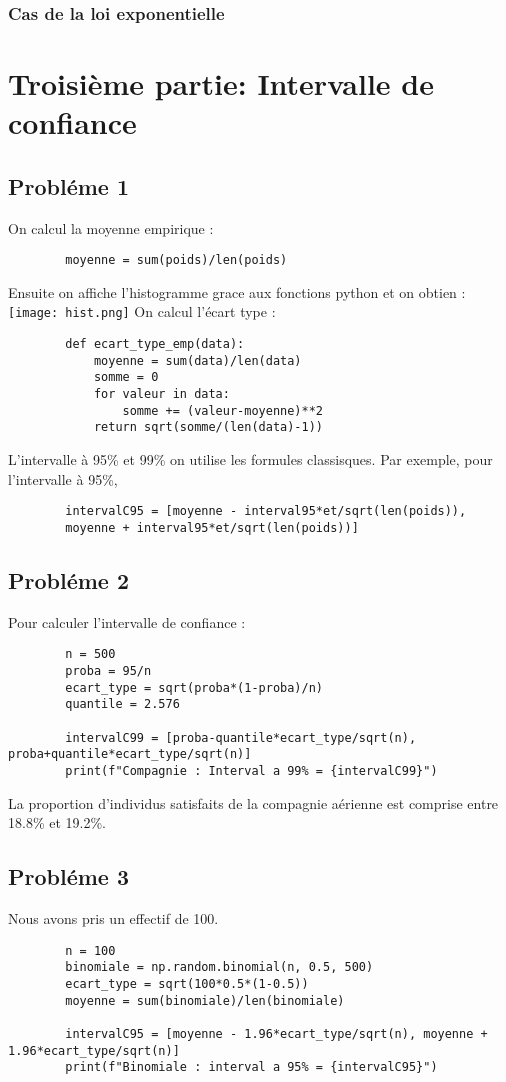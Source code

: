 \documentclass{article}
\begin{document}
    \subsubsection{Cas de la loi exponentielle}
    \newpage
    \section{Troisième partie: Intervalle de confiance}
    \subsection{Probléme 1}
    On calcul la moyenne empirique : 
    \begin{lstlisting}
        moyenne = sum(poids)/len(poids)
    \end{lstlisting}
    Ensuite on affiche l'histogramme grace aux fonctions python et on obtien : \\
    \texttt{[image: hist.png]} 
    \newpage
    On calcul l'écart type : 
    \begin{lstlisting}
        def ecart_type_emp(data):
            moyenne = sum(data)/len(data)
            somme = 0
            for valeur in data:
                somme += (valeur-moyenne)**2
            return sqrt(somme/(len(data)-1))
    \end{lstlisting}
    L'intervalle à 95\% et 99\% on utilise les formules classisques. Par exemple, pour l'intervalle à 95\%,
    \begin{lstlisting}
        intervalC95 = [moyenne - interval95*et/sqrt(len(poids)),
        moyenne + interval95*et/sqrt(len(poids))]
    \end{lstlisting}
    \subsection{Probléme 2}
    Pour calculer l'intervalle de confiance : 
    \begin{lstlisting}
        n = 500
        proba = 95/n
        ecart_type = sqrt(proba*(1-proba)/n)
        quantile = 2.576

        intervalC99 = [proba-quantile*ecart_type/sqrt(n), proba+quantile*ecart_type/sqrt(n)]
        print(f"Compagnie : Interval a 99% = {intervalC99}")
    \end{lstlisting}
    La proportion d'individus satisfaits de la compagnie aérienne est comprise entre 18.8\% et 19.2\%. 
    \subsection{Probléme 3}
    Nous avons pris un effectif de 100.
    \begin{lstlisting}
        n = 100
        binomiale = np.random.binomial(n, 0.5, 500)
        ecart_type = sqrt(100*0.5*(1-0.5))
        moyenne = sum(binomiale)/len(binomiale)

        intervalC95 = [moyenne - 1.96*ecart_type/sqrt(n), moyenne + 1.96*ecart_type/sqrt(n)]
        print(f"Binomiale : interval a 95% = {intervalC95}")
    \end{lstlisting}
\end{document}
